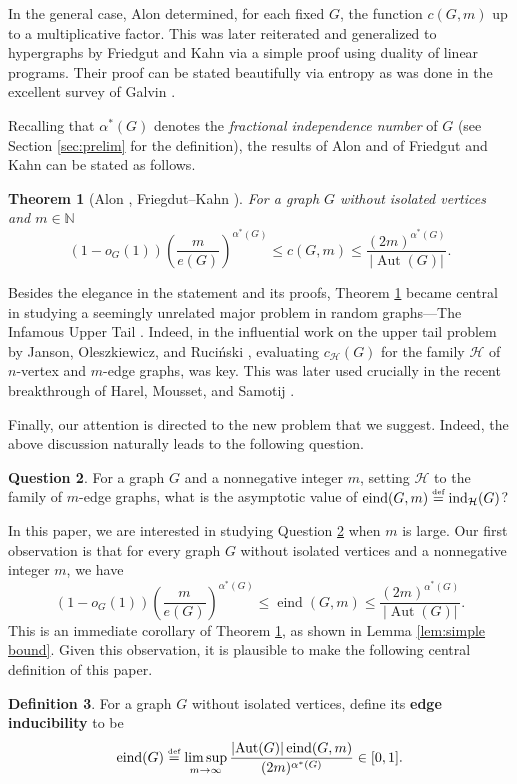 \documentclass[reqno,11pt]{amsart}
\numberwithin{equation}{section}
\newtheorem{theorem}{Theorem}[section]
\theoremstyle{definition}
\newtheorem{definition}[theorem]{Definition}
\newtheorem{question}[theorem]{Question}
\theoremstyle{remark}
\newcommand{\abs}[1]{\left\lvert#1\right\rvert}
\DeclareMathOperator{\ind}{ind}
\DeclareMathOperator{\eind}{eind}
\DeclareMathOperator{\Aut}{Aut}
\newcommand*{\eqdef}{\stackrel{\mbox{\normalfont\tiny def}}{=}}
\begin{document}
In the general case, Alon \cite{Alo1981} determined, for each fixed $G$, the function $c(G,m)$ up to a multiplicative factor. 
This was later reiterated and generalized to hypergraphs by Friedgut and Kahn \cite{FriKah1998} via a simple proof using duality of linear programs. Their proof can be stated beautifully via entropy as was done in the excellent survey of Galvin \cite{Gal2014}.

Recalling that $\alpha^*(G)$ denotes the \emph{fractional independence number} of $G$ (see Section \ref{sec:prelim} for the definition), the results of Alon and of Friedgut and Kahn can be stated as follows.

\begin{theorem}[Alon \cite{Alo1981}, Friegdut--Kahn \cite{FriKah1998}]\label{thm: Alon}
For a graph $G$ without isolated vertices and $m\in \mathbb{N}$
	\[ 
		(1-o_G(1))\left(\frac{m}{e(G)}\right)^{\alpha^*(G)}\le c(G,m)\le \frac{(2m)^{\alpha^*(G)}}{|\Aut(G)|}.
	\]
\end{theorem}

Besides the elegance in the statement and its proofs, Theorem \ref{thm: Alon} became central in studying a seemingly unrelated major problem in random graphs---The Infamous Upper Tail \cite{JanRuc2002}. 
Indeed, in the influential work on the upper tail problem by Janson, Oleszkiewicz, and Ruci\'nski \cite{JanOleRuc2004}, evaluating $c_\mathcal{H}(G)$ for the family $\mathcal{H}$ of $n$-vertex and $m$-edge graphs, was key. 
This was later used crucially in the recent breakthrough of Harel, Mousset, and Samotij \cite{HarMouSam2022}.

Finally, our attention is directed to the new problem that we suggest. Indeed, the above discussion naturally leads to the following question.
\begin{question}\label{question: edge inducibility}
	 For a graph $G$ and a nonnegative integer $m$, setting $\mathcal{H}$ to the family of $m$-edge graphs, what is the asymptotic value of $\eind(G,m)\eqdef \ind_{\mathcal{H}}(G)$?
\end{question}

In this paper, we are interested in studying Question \ref{question: edge inducibility} when $m$ is large. Our first observation is that for every graph $G$ without isolated vertices and a nonnegative integer $m$, we have
\begin{equation}\label{eq: trivial bounds on edge inducibility}
    (1-o_G(1))\left(\frac{m}{e(G)}\right)^{\alpha^*(G)}\le \eind(G,m)\le \frac{(2m)^{\alpha^*(G)}}{\abs{\Aut(G)}}.
\end{equation}
This is an immediate corollary of Theorem \ref{thm: Alon}, as shown in Lemma \ref{lem:simple bound}. Given this observation, it is plausible to make the following central definition of this paper.
\begin{definition}
	For a graph $G$ without isolated vertices, define its \textbf{edge inducibility} to be
\[
	\eind(G) \eqdef \limsup_{m\to\infty} \frac{\abs{\Aut(G)}\eind(G,m)}{(2m)^{\alpha^*(G)}}\in [0,1].
\]
\end{definition}
\end{document}
